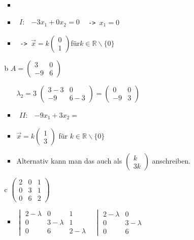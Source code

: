 \documentclass{article}
\newcommand{\R}{\mathbb{R}}
\begin{document}
\begin{itemize}
\begin{itemize}
\begin{itemize}
				\item{}
				\item{$\begin{matrix} I: & -3x_1+0x_2=0 \end{matrix}$ \texttt{ -> }$x_1=0$}
				\item{\texttt{ -> }$\vec{x}=k \begin{pmatrix} 0 \\ 1 \end{pmatrix}$für$k\in\R\backslash\{0\}$}
			\end{itemize}
			\item[b]{$A=\begin{pmatrix} 3 & 0 \\ -9 & 6 \end{pmatrix}$}
			\begin{itemize}
				\item[$\lambda_2=3$]{$\begin{pmatrix} 3-3 & 0 \\ -9 & 6-3 \end{pmatrix}=\begin{pmatrix} 0 & 0 \\ -9 & 3 \end{pmatrix}$}
				\item{$\begin{matrix} II: & -9x_1+3x_2= \end{matrix}$}
				\item{$\vec{x}=k \begin{pmatrix} 1 \\ 3 \end{pmatrix}$ für $k\in\R\backslash\{0\}$}
				\item{Alternativ kann man das auch als $\begin{pmatrix} k \\ 3k \end{pmatrix}$ anschreiben.}
			\end{itemize}
			\item[c]{$\begin{pmatrix} 2 & 0 & 1 \\ 0 & 3 & 1 \\ 0 & 6 & 2 \end{pmatrix}$}
			\begin{itemize}
				\item{$\begin{vmatrix} 2-\lambda & 0 & 1 &  \\ 0 & 3-\lambda & 1 \\ 0 & 6 & 2-\lambda \end{vmatrix}\begin{matrix} 2-\lambda & 0 \\ 0 & 3-\lambda \\ 0 & 6 \end{matrix}$}

\end{itemize}
\end{itemize}
\end{itemize}
\end{document}
